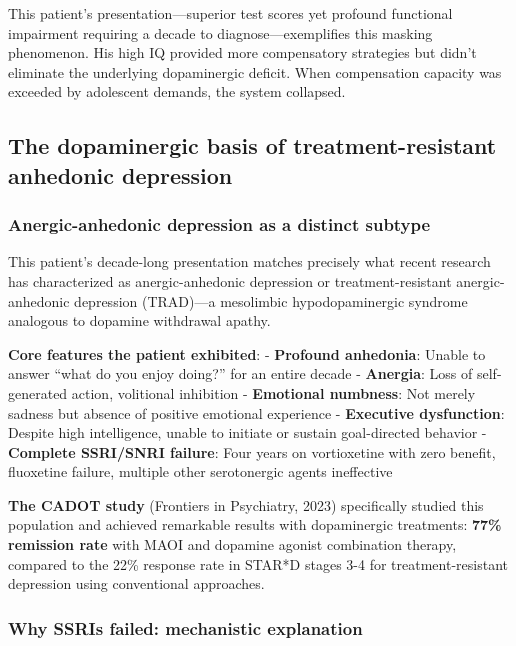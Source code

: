 This patient's presentation---superior test scores yet profound functional impairment requiring a decade to diagnose---exemplifies this masking phenomenon. His high IQ provided more compensatory strategies but didn't eliminate the underlying dopaminergic deficit. When compensation capacity was exceeded by adolescent demands, the system collapsed.

\subsection{The dopaminergic basis of treatment-resistant anhedonic depression}\label{10a_trd_basis-the-dopaminergic-basis-of-treatment-resistant-anhedonic-depression}

\subsubsection{Anergic-anhedonic depression as a distinct subtype}\label{10a_trd_basis-anergic-anhedonic-depression-as-a-distinct-subtype}

This patient's decade-long presentation matches precisely what recent research has characterized as anergic-anhedonic depression or treatment-resistant anergic-anhedonic depression (TRAD)---a mesolimbic hypodopaminergic syndrome analogous to dopamine withdrawal apathy.

\textbf{Core features the patient exhibited}: - \textbf{Profound anhedonia}: Unable to answer ``what do you enjoy doing?'' for an entire decade - \textbf{Anergia}: Loss of self-generated action, volitional inhibition - \textbf{Emotional numbness}: Not merely sadness but absence of positive emotional experience - \textbf{Executive dysfunction}: Despite high intelligence, unable to initiate or sustain goal-directed behavior - \textbf{Complete SSRI/SNRI failure}: Four years on vortioxetine with zero benefit, fluoxetine failure, multiple other serotonergic agents ineffective

\textbf{The CADOT study} (Frontiers in Psychiatry, 2023) specifically studied this population and achieved remarkable results with dopaminergic treatments: \textbf{77\% remission rate} with MAOI and dopamine agonist combination therapy, compared to the 22\% response rate in STAR*D stages 3-4 for treatment-resistant depression using conventional approaches.

\subsubsection{Why SSRIs failed: mechanistic explanation}\label{10a_trd_basis-why-ssris-failed-mechanistic-explanation}

